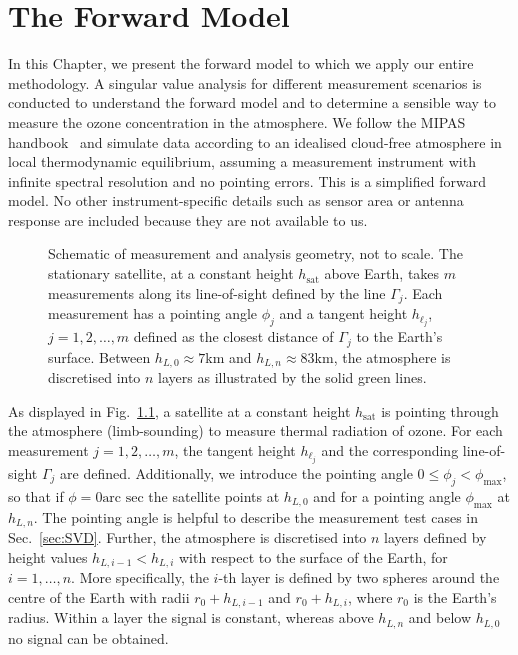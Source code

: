 \chapter{The Forward Model}
\label{ch:formodel}
\thispagestyle{empty}

In this Chapter, we present the forward model to which we apply our entire methodology.
A singular value analysis for different measurement scenarios is conducted to understand the forward model and to determine a sensible way to measure the ozone concentration in the atmosphere. We follow the MIPAS handbook~\cite{mipas2000handbook} and simulate data according to an idealised cloud-free atmosphere in local thermodynamic equilibrium, assuming a measurement instrument with infinite spectral resolution and no pointing errors.
This is a simplified forward model.
No other instrument-specific details such as sensor area or antenna response are included because they are not available to us. 

\begin{figure}[ht!]
	\centering
	
	\caption[Schematic of measurement and analysis geometry.]{Schematic of measurement and analysis geometry, not to scale.
		The stationary satellite, at a constant height $h_\text{sat}$ above Earth, takes $m$ measurements along its line-of-sight defined by the line $\Gamma_j$.
		Each measurement has a pointing angle $\phi_j$ and a tangent height $h_{\ell_j}$, $j=1,2,\dots,m$ defined as the closest distance of $\Gamma_j$ to the Earth's surface.
		Between $h_{L,0} \approx 7$km and $h_{L,n} \approx 83$km, the atmosphere is discretised into $n$ layers as illustrated by the solid green lines.}
	\label{fig:LIMB}
\end{figure}
As displayed in Fig.~\ref{fig:LIMB}, a satellite at a constant height $h_{\text{sat}}$ is pointing through the atmosphere (limb-sounding) to measure thermal radiation of ozone.
For each measurement $j=1,2,\ldots,m$, the tangent height $h_{\ell_j}$ and the corresponding line-of-sight $\Gamma_j$ are defined.
Additionally, we introduce the pointing angle $0 \leq \phi_j < \phi_{\text{max}}$, so that if $\phi = 0 \text{arc sec}$ the satellite points at $h_{L,0}$ and for a pointing angle $\phi_{\text{max}}$ at $h_{L,n}$.
The pointing angle is helpful to describe the measurement test cases in Sec.~\ref{sec:SVD}.
Further, the atmosphere is discretised into $n$ layers defined by height values $h_{L,i-1} < h_{L,i}$ with respect to the surface of the Earth, for $i = 1, \dots, n$.
More specifically, the $i$-th layer is defined by two spheres around the centre of the Earth with radii $ r_0 + h_{L,i-1} $ and $r_0 + h_{L,i}$, where $r_0$ is the Earth's radius.
Within a layer the signal is constant, whereas above $h_{L, n}$ and below $h_{L,0} $ no signal can be obtained.


